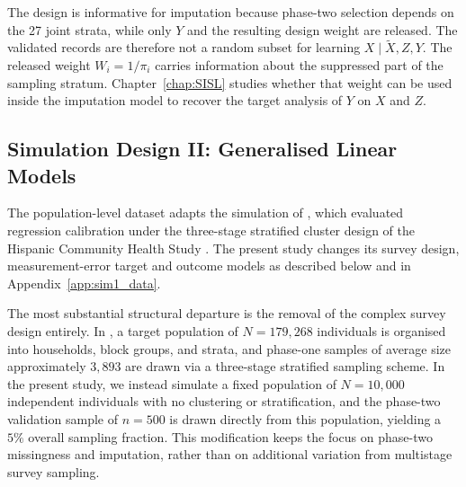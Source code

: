 The design is informative for imputation because phase-two selection depends on the 27 joint strata, while only $Y$ and the resulting design weight are released. The validated records are therefore not a random subset for learning $X\mid \tilde{X},Z,Y$. The released weight $W_i=1/\pi_i$ carries information about the suppressed part of the sampling stratum. Chapter~\ref{chap:SISL} studies whether that weight can be used inside the imputation model to recover the target analysis of $Y$ on $X$ and $Z$.

\subsection{Simulation Design II: Generalised Linear Models}
\label{sec:sim1context}
The population-level dataset adapts the simulation of \citet{baldoni2021use}, which evaluated regression calibration under the three-stage stratified cluster design of the Hispanic Community Health Study \citep{Sorlie2010}. The present study changes its survey design, measurement-error target and outcome models as described below and in Appendix~\ref{app:sim1_data}.

The most substantial structural departure is the removal of the complex survey design entirely. In \citet{baldoni2021use}, a target population of $N = 179{,}268$ individuals is organised into households, block groups, and strata, and phase-one samples of average size approximately $3{,}893$ are drawn via a three-stage stratified sampling scheme. In the present study, we instead simulate a fixed population of $N = 10{,}000$ independent individuals with no clustering or stratification, and the phase-two validation sample of $n = 500$ is drawn directly from this population, yielding a $5\%$ overall sampling fraction. This modification keeps the focus on phase-two missingness and imputation, rather than on additional variation from multistage survey sampling.

